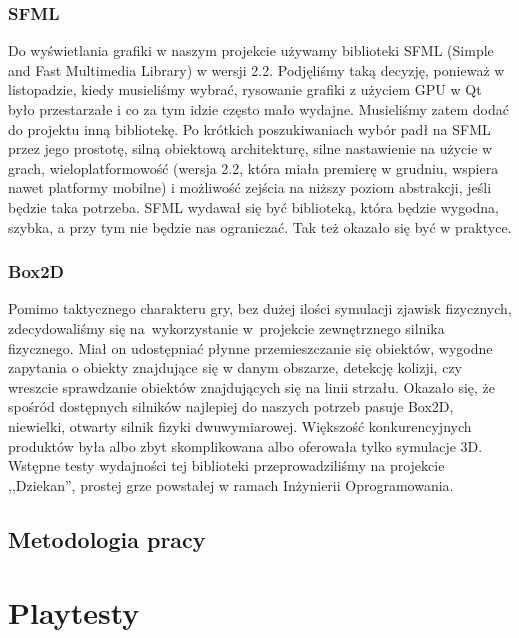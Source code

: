 \documentclass[licencjacka]{pracamgr}
\begin{document}
    \subsection{SFML}
    Do wyświetlania grafiki w naszym projekcie używamy biblioteki SFML (Simple and Fast Multimedia Library) w wersji
    2.2. Podjęliśmy taką decyzję, ponieważ w listopadzie, kiedy musieliśmy wybrać, rysowanie grafiki z użyciem GPU w Qt
    było przestarzałe i co za tym idzie często mało wydajne. Musieliśmy zatem dodać do projektu inną bibliotekę. Po
    krótkich poszukiwaniach wybór padł na SFML przez jego prostotę, silną obiektową architekturę, silne nastawienie na
    użycie w grach, wieloplatformowość (wersja 2.2, która miała premierę w grudniu, wspiera nawet platformy mobilne) i
    możliwość zejścia na niższy poziom abstrakcji, jeśli będzie taka potrzeba. SFML wydawał się być biblioteką, która
    będzie wygodna, szybka, a przy tym nie będzie nas ograniczać. Tak też okazało się być w praktyce.

    \subsection{Box2D}
    Pomimo taktycznego charakteru gry, bez dużej ilości symulacji zjawisk fizycznych, zdecydowaliśmy się na~wykorzystanie
    w~projekcie zewnętrznego silnika fizycznego. Miał on udostępniać płynne przemieszczanie się obiektów, wygodne
    zapytania o obiekty znajdujące się w danym obszarze, detekcję kolizji, czy wreszcie sprawdzanie obiektów
    znajdujących się na linii strzału. Okazało się, że spośród dostępnych silników najlepiej do naszych potrzeb pasuje
    Box2D, niewielki, otwarty silnik fizyki dwuwymiarowej. Większość konkurencyjnych produktów była albo zbyt skomplikowana albo oferowała
    tylko symulacje 3D. Wstępne testy wydajności tej biblioteki przeprowadziliśmy na projekcie ,,Dziekan'', prostej grze
    powstałej w ramach Inżynierii Oprogramowania.

  \section{Metodologia pracy}

\chapter{Playtesty}
\end{document}
